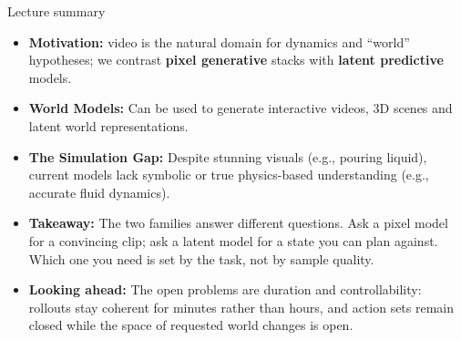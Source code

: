 \begin{frame}{Lecture summary}
  \small
  \begin{itemize}\itemsep0.22em
    \item[\textcolor{red}{$\blacktriangleright$}] \textbf{Motivation:} video is the natural domain for dynamics and ``world'' hypotheses; we contrast \textbf{pixel generative} stacks with \textbf{latent predictive} models.
    \item[\textcolor{red}{$\blacktriangleright$}] \textbf{World Models:} Can be used to generate interactive videos, 3D scenes and latent world representations.
    \item[\textcolor{red}{$\blacktriangleright$}] \textbf{The Simulation Gap:} Despite stunning visuals (e.g., pouring liquid), current models lack symbolic or true physics-based understanding (e.g., accurate fluid dynamics).
    \item[\textcolor{red}{$\blacktriangleright$}] \textbf{Takeaway:} The two families answer different questions. Ask a pixel model for a convincing clip; ask a latent model for a state you can plan against. Which one you need is set by the task, not by sample quality.
    \item[\textcolor{red}{$\blacktriangleright$}] \textbf{Looking ahead:} The open problems are duration and controllability: rollouts stay coherent for minutes rather than hours, and action sets remain closed while the space of requested world changes is open.
  \end{itemize}
\end{frame}
